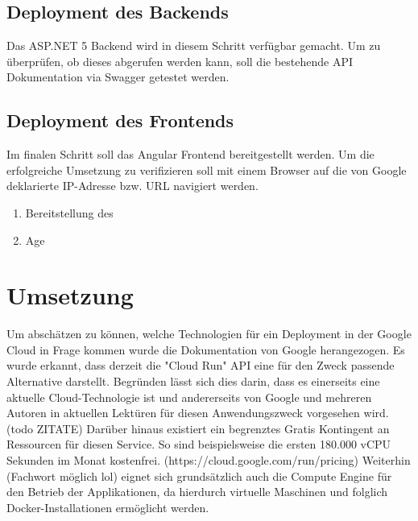 \documentclass[pdftex,a4paper,abstracton,11pt,parskip=half,bibtotocnumbered]{scrartcl}
\begin{document}
	\subsection{Deployment des Backends}
	Das ASP.NET 5 Backend wird in diesem Schritt verfügbar gemacht. Um zu überprüfen, ob dieses abgerufen werden kann, soll die bestehende API 
	Dokumentation via Swagger getestet werden. 
	
	\subsection{Deployment des Frontends}
	Im finalen Schritt soll das Angular Frontend bereitgestellt werden. Um die erfolgreiche Umsetzung zu verifizieren soll mit einem Browser auf
	die von Google deklarierte IP-Adresse bzw. URL navigiert werden.


\begin{enumerate}
	\item Bereitstellung des  
	\item Age
\end{enumerate}

\section{Umsetzung}
	Um abschätzen zu können, welche Technologien für ein Deployment in der Google Cloud in Frage kommen wurde die Dokumentation von Google herangezogen.
	Es wurde erkannt, dass derzeit die "Cloud Run" API eine für den Zweck passende Alternative darstellt. Begründen lässt sich dies darin, dass es einerseits 
	eine aktuelle Cloud-Technologie ist und andererseits von Google und mehreren Autoren in aktuellen Lektüren für diesen Anwendungszweck vorgesehen wird.(todo ZITATE)
	Darüber hinaus existiert ein begrenztes Gratis Kontingent an Ressourcen für diesen Service. So sind beispielsweise die ersten 180.000 vCPU Sekunden 
	im Monat kostenfrei. (https://cloud.google.com/run/pricing)
	Weiterhin (Fachwort möglich lol) eignet sich grundsätzlich auch die Compute Engine für den Betrieb der Applikationen, da hierdurch virtuelle Maschinen
	und folglich Docker-Installationen ermöglicht werden.
\end{document}
